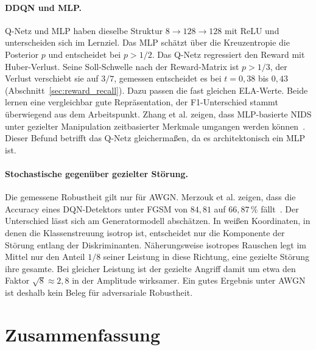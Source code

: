 \paragraph{DDQN und MLP.} Q-Netz und MLP haben dieselbe Struktur $8\to128\to128$ mit ReLU und unterscheiden sich im Lernziel. Das MLP schätzt über die Kreuzentropie die Posterior $p$ und entscheidet bei $p>1/2$. Das Q-Netz regressiert den Reward mit Huber-Verlust. Seine Soll-Schwelle nach der Reward-Matrix ist $p>1/3$, der Verlust verschiebt sie auf $3/7$, gemessen entscheidet es bei $t=0{,}38$ bis $0{,}43$ (Abschnitt~\ref{sec:reward_recall}). Dazu passen die fast gleichen ELA-Werte. Beide lernen eine vergleichbar gute Repräsentation, der F1-Unterschied stammt überwiegend aus dem Arbeitspunkt. Zhang et al. zeigen, dass MLP-basierte NIDS unter gezielter Manipulation zeitbasierter Merkmale umgangen werden können~\autocite{zhangAdversarialAttacksDeep2022}. Dieser Befund betrifft das Q-Netz gleichermaßen, da es architektonisch ein MLP ist.

\paragraph{Stochastische gegenüber gezielter Störung.} Die gemessene Robustheit gilt nur für AWGN. Merzouk et al. zeigen, dass die Accuracy eines DQN-Detektors unter FGSM von $84{,}81$ auf $66{,}87\,\%$ fällt~\autocite{merzoukEvadingDeepReinforcement2022}. Der Unterschied lässt sich am Generatormodell abschätzen. In weißen Koordinaten, in denen die Klassenstreuung isotrop ist, entscheidet nur die Komponente der Störung entlang der Diskriminanten. Näherungsweise isotropes Rauschen legt im Mittel nur den Anteil $1/8$ seiner Leistung in diese Richtung, eine gezielte Störung ihre gesamte. Bei gleicher Leistung ist der gezielte Angriff damit um etwa den Faktor $\sqrt{8}\approx2{,}8$ in der Amplitude wirksamer. Ein gutes Ergebnis unter AWGN ist deshalb kein Beleg für adversariale Robustheit.

\section{Zusammenfassung}
\label{sec:ergebnisse_zusammenfassung}

